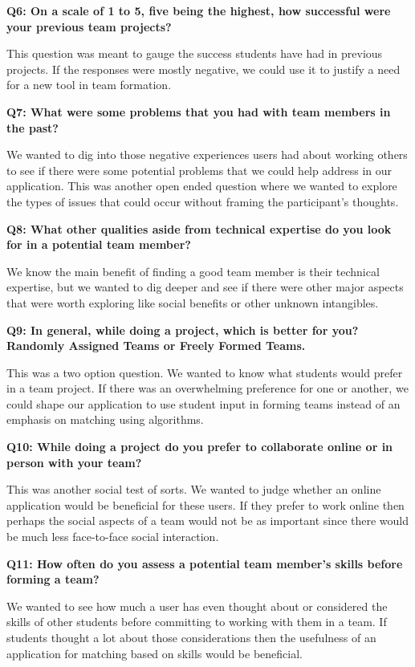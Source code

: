 \documentclass[conference]{IEEEtran}
\begin{document}
\textbf{Q6: On a scale of 1 to 5, five being the highest, how successful were your
previous team projects?}

This question was meant to gauge the success students have had in previous projects. If the 
responses were mostly negative, we could use it to justify a need for a new tool in team formation.

\textbf{Q7: What were some problems that you had with team members in the past?}

We wanted to dig into those negative experiences users had about working others to see if there
were some potential problems that we could help address in our application. This was another open
ended question where we wanted to explore the types of issues that could occur without framing the 
participant's thoughts. 

\textbf{Q8: What other qualities aside from technical expertise do you look for in a potential team member?}

We know the main benefit of finding a good team member is their technical expertise, but we wanted
to dig deeper and see if there were other major aspects that were worth exploring like social 
benefits or other unknown intangibles. 

\textbf{Q9: In general, while doing a project, which is better for you? Randomly Assigned Teams or
Freely Formed Teams.}

This was a two option question. We wanted to know what students would prefer in a team project. 
If there was an overwhelming preference for one or another, we could shape our application to use 
student input in forming teams instead of an emphasis on matching using algorithms. 

\textbf{Q10: While doing a project do you prefer to collaborate online or in person with your team?}

This was another social test of sorts. We wanted to judge whether an online application would be 
beneficial for these users. If they prefer to work online then perhaps the social aspects of a team
would not be as important since there would be much less face-to-face social interaction. 

\textbf{Q11: How often do you assess a potential team member's skills before forming a team?}

We wanted to see how much a user has even thought about or considered the skills of other students
before committing to working with them in a team. If students thought a lot about those considerations
then the usefulness of an application for matching based on skills would be beneficial. 
\end{document}
